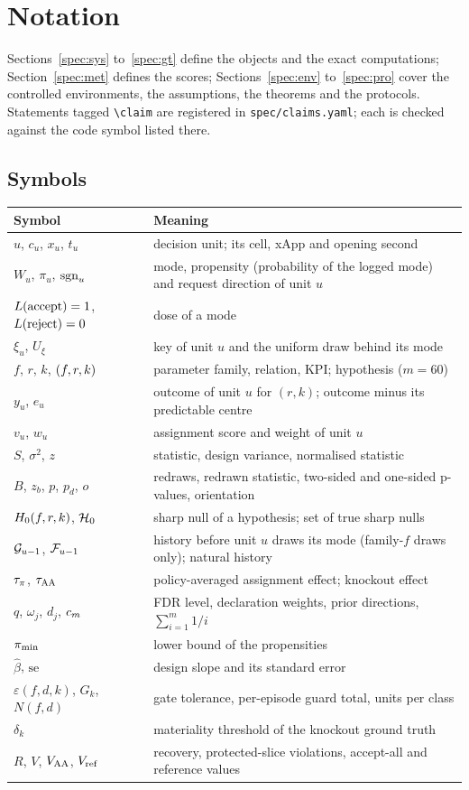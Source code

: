 \section{Notation}
\label{spec:notation}

Sections~\ref{spec:sys} to~\ref{spec:gt} define the objects and the exact computations; Section~\ref{spec:met} defines the scores; Sections~\ref{spec:env} to~\ref{spec:pro} cover the controlled environments, the assumptions, the theorems and the protocols. Statements tagged \verb|\claim| are registered in \verb|spec/claims.yaml|; each is checked against the code symbol listed there.

\subsection*{Symbols}

\begin{tabular}{@{}p{}p{}@{}}
\toprule
Symbol & Meaning \\
\midrule
$u$, $c_u$, $x_u$, $t_u$ & decision unit; its cell, xApp and opening second \\
$W_u$, $\pi_u$, $\mathrm{sgn}_u$ & mode, propensity (probability of the logged mode) and request direction of unit $u$ \\
$L(\text{accept}) = 1$, $L(\text{reject}) = 0$ & dose of a mode \\
$\xi_u$, $U_\xi$ & key of unit $u$ and the uniform draw behind its mode \\
$f$, $r$, $k$, $(f, r, k)$ & parameter family, relation, KPI; hypothesis ($m = 60$) \\
$y_u$, $e_u$ & outcome of unit $u$ for $(r, k)$; outcome minus its predictable centre \\
$v_u$, $w_u$ & assignment score and weight of unit $u$ \\
$S$, $\sigma^2$, $z$ & statistic, design variance, normalised statistic \\
$B$, $z_b$, $p$, $p_d$, $o$ & redraws, redrawn statistic, two-sided and one-sided p-values, orientation \\
$H_0(f, r, k)$, $\mathcal{H}_0$ & sharp null of a hypothesis; set of true sharp nulls \\
$\mathcal{G}_{u-1}$, $\mathcal{F}_{u-1}$ & history before unit $u$ draws its mode (family-$f$ draws only); natural history \\
$\tau_{\pi}$, $\tau_{\mathrm{AA}}$ & policy-averaged assignment effect; knockout effect \\
$q$, $\omega_j$, $d_j$, $c_m$ & FDR level, declaration weights, prior directions, $\sum_{i=1}^m 1/i$ \\
$\pi_{\min}$ & lower bound of the propensities \\
$\hat\beta$, $\mathrm{se}$ & design slope and its standard error \\
$\varepsilon(f, d, k)$, $G_k$, $N(f, d)$ & gate tolerance, per-episode guard total, units per class \\
$\delta_k$ & materiality threshold of the knockout ground truth \\
$R$, $V$, $V_{\mathrm{AA}}$, $V_{\mathrm{ref}}$ & recovery, protected-slice violations, accept-all and reference values \\
\bottomrule
\end{tabular}

